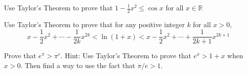 \documentclass[12pt,letterpaper,boxed,cm]{hmcpset}
\newcommand{\pn}[1]{\left( #1 \right)}
\newcommand{\R}[0]{\mathbb{R}}
\begin{document}

\begin{problem}[(1)]
    Use Taylor's Theorem to prove that $\displaystyle 1- \frac{1}{2}x^2\le\cos x$ for all $x\in \R$
\end{problem}

\begin{solution}
    \vfill
\end{solution}
\newpage

\begin{problem}[(2)]
    Use Taylor's Theorem to prove that for any positive integer $k$ for all $x>0$,
    \[
        x- \frac{1}{2}x^2+\cdots- \frac{1}{2k}x^{2k}<\ln\pn{1+x}<x- \frac{1}{2}x^2+\cdots+\frac{1}{2k+1}x^{2k+1}
    \]
\end{problem}

\begin{solution}
    \vfill
\end{solution}
\newpage

\begin{problem}[(3)]
    Prove that $\displaystyle e^\pi>\pi^e$. Hint: Use Taylor's Theorem to prove that $\displaystyle e^x>1+x$ when $x>0$. Then find a way to use the fact that $\displaystyle \pi/e>1.$
\end{problem}

\begin{solution}
    \vfill
\end{solution}
\newpage
\end{document}
